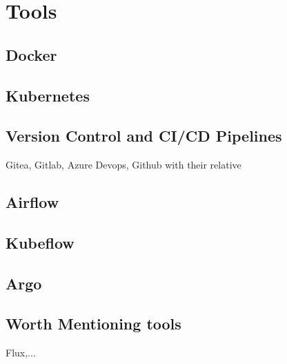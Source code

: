 \section{Tools}\label{sec:tools}

\subsection{Docker}
\subsection{Kubernetes}
\subsection{Version Control and CI/CD Pipelines}
Gitea, Gitlab, Azure Devops, Github with their relative
\subsection{Airflow}
\subsection{Kubeflow}
\subsection{Argo}
\subsection{Worth Mentioning tools}
Flux,...